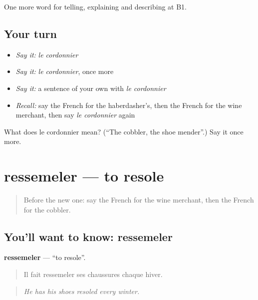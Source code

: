 \begin{grammarlens}[title={What you've built}]
One more word for telling, explaining and describing at B1.
\end{grammarlens}

\subsection*{Your turn}
\begin{itemize}
\raggedright
  \item \emph{Say it:} \emph{le cordonnier}
  \item \emph{Say it:} \emph{le cordonnier}, once more
  \item \emph{Say it:} a sentence of your own with \emph{le cordonnier}
  \item \emph{Recall:} say the French for the haberdasher’s, then the French for the wine merchant, then say \emph{le cordonnier} again
\end{itemize}

\begin{tcolorbox}[breakable,colback=teal!4,colframe=teal!35!black,title={Before you move on}]
What does le cordonnier mean? (\textquotedblleft{}The cobbler, the shoe mender\textquotedblright{}.) Say it once more.
\end{tcolorbox}
\section[ressemeler]{ressemeler — to resole}

\label{lesson:FR-C446-ressemeler}



\begin{quote}
Before the new one: say the French for the wine merchant, then the French for the cobbler.
\end{quote}

\subsection*{You'll want to know: ressemeler}
\textbf{ressemeler} — \textquotedblleft{}to resole\textquotedblright{}.

\begin{quote}
Il fait ressemeler ses chaussures chaque hiver.
\end{quote}

\begin{quote}
\emph{He has his shoes resoled every winter.}
\end{quote}

